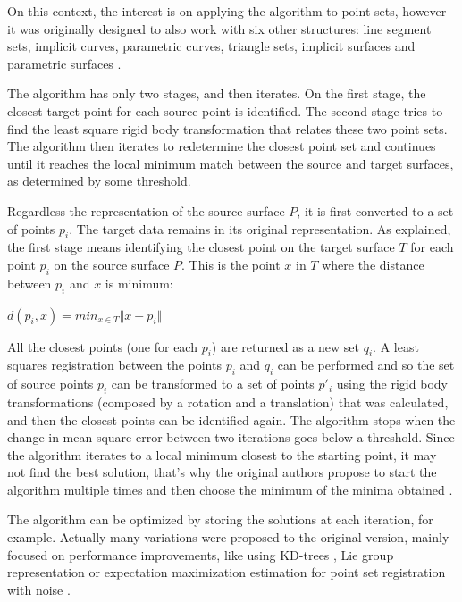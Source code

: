 \documentclass[msc, a4paper, classic, en]{ufbathesis}
\begin{document}
On this context, the interest is on applying the algorithm to point sets, however it was originally designed to also work with six other structures: line segment sets, implicit curves, parametric curves, triangle sets, implicit surfaces and parametric surfaces \cite{hajnal2014medical}.

The algorithm has only two stages, and then iterates. On the first stage, the closest target point for each source point is identified. The second stage tries to find the least square rigid body transformation that relates these two point sets. The algorithm then iterates to redetermine the closest point set and continues until it reaches the local minimum match between the source and target surfaces, as determined by some threshold.

Regardless the representation of the source surface $P$, it is first converted to a set of points ${p_i}$. The target data remains in its original representation. As explained, the first stage means identifying the closest point on the target surface $T$ for each point $p_i$ on the source surface $P$. This is the point $x$ in $T$ where the distance between $p_i$ and $x$ is minimum:

\begin{center}
  $d(p_i, x) = min_{x \in T} \Vert x - p_i \Vert$
\end{center}

All the closest points (one for each $p_i$) are returned as a new set ${q_i}$. A least squares registration between the points $p_i$ and $q_i$ can be performed and so the set of source points $p_i$ can be transformed to a set of points $p'_i$ using the rigid body transformations (composed by a rotation and a translation) that was calculated, and then the closest points can be identified again. The algorithm stops when the change in mean square error between two iterations goes below a threshold. Since the algorithm iterates to a local minimum closest to the starting point, it may not find the best solution, that's why the original authors propose to start the algorithm multiple times and then choose the minimum of the minima obtained \cite{icp}.

The algorithm can be optimized by storing the solutions at each iteration, for example. Actually many variations were proposed to the original version, mainly focused on performance improvements, like using KD-trees \cite{zhang1994}, Lie group representation \cite{Dong201467} or expectation maximization estimation for point set registration with noise \cite{6957732}.
\end{document}
